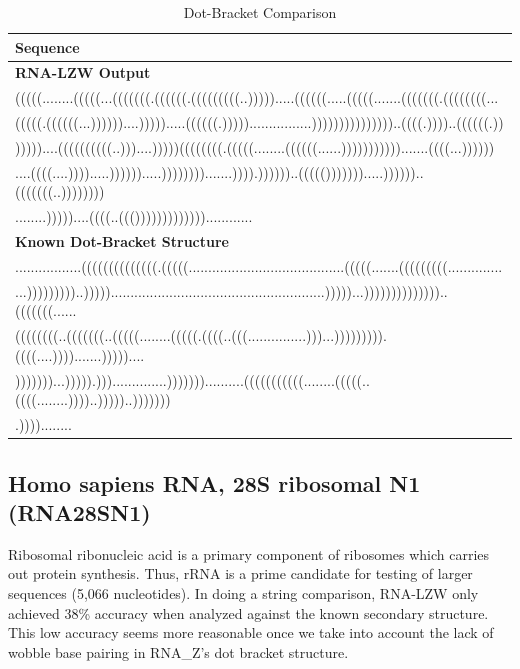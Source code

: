 \documentclass[sigconf]{acmart}
\begin{document}
\begin{table}
  \caption{Dot-Bracket Comparison}
  \label{tab:telomerase}
  \begin{tabular}{l}
    \textbf{Sequence}\\
    \midrule
    \textbf{RNA-LZW Output}\\
    (((((........(((((...(((((((.((((((.(((((((((..))))).....((((((.....(((((.......(((((((.((((((((...\\
    (((((.((((((...))))))....))))).....((((((.)))))................)))))))))))))))..((((.))))..((((((.))\\
    )))))....((((((((((..)))....)))))((((((((.(((((........((((((......))))))))))).......((((...))))))\\
    ....((((....)))).....)))))).....)))))))).......)))).))))))..((((())))))).....))))))..(((((((..))))))))\\
    ........)))))....((((..((()))))))))))))............\\
    \midrule 
    \textbf{Known Dot-Bracket Structure}\\
    .................((((((((((((((.(((((........................................(((((.......(((((((((..............\\
    ...)))))))))..))))).......................................................)))))...))))))))))))))..(((((((......\\
    ((((((((..(((((((..(((((........(((((.((((..(((...............)))...))))))))).((((....)))).......)))))....\\
    )))))))...))))).)))..............)))))))..........(((((((((((........(((((..((((........))))..)))))..)))))))\\
    .))))........
\end{tabular}
\end{table}

\subsection{Homo sapiens RNA, 28S ribosomal N1 (RNA28SN1)}

Ribosomal ribonucleic acid is a primary component of ribosomes which carries out protein synthesis. Thus, rRNA is a prime candidate for testing of larger sequences (5,066 nucleotides). 
In doing a string comparison, RNA-LZW only achieved 38\% accuracy when analyzed against the known secondary structure.  This low accuracy seems more reasonable once we take into account the lack of wobble base pairing in RNA\_Z's dot bracket structure.  
\end{document}
